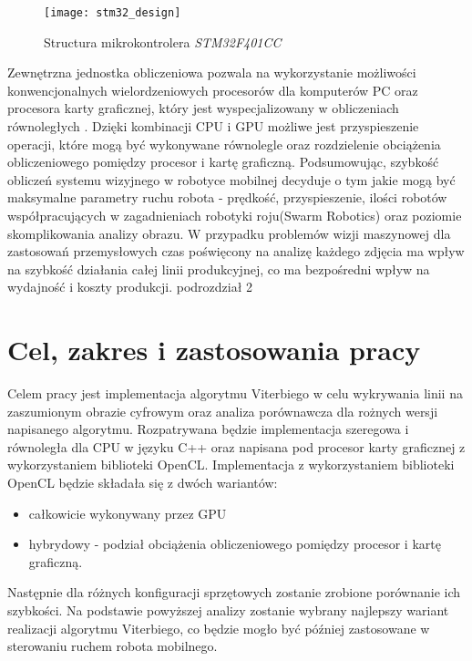 \documentclass[document.tex]{subfiles}
\begin{document}
	\begin{figure}[h]
	\texttt{[image: stm32\_design]}
	\caption{Structura mikrokontrolera \textit{STM32F401CC}\protect\cite{STM32_microcontrollers}}
	\label{fig:stm32}
	\end{figure}

Zewnętrzna jednostka obliczeniowa pozwala na wykorzystanie możliwości konwencjonalnych wielordzeniowych procesorów dla komputerów PC oraz procesora karty graficznej, który jest wyspecjalizowany w obliczeniach równoległych\cite{GPU_vs_CPU_nvidia} \cite{Computer_Architecture_Patterson_Hennesy}\cite{GPUs_Closer_Look}. 
Dzięki kombinacji CPU i GPU możliwe jest przyspieszenie operacji,
które mogą być wykonywane równolegle oraz rozdzielenie obciążenia obliczeniowego pomiędzy
procesor i kartę graficzną. 
\indent Podsumowując, szybkość obliczeń systemu wizyjnego w robotyce mobilnej decyduje o tym jakie
mogą być maksymalne parametry ruchu robota - prędkość, przyspieszenie, ilości robotów współpracujących w zagadnieniach robotyki roju(Swarm Robotics) oraz poziomie skomplikowania
analizy obrazu. W przypadku problemów wizji maszynowej dla zastosowań przemysłowych czas poświęcony na analizę każdego zdjęcia ma wpływ na szybkość działania całej linii produkcyjnej, co ma bezpośredni wpływ na wydajność i koszty produkcji.  
podrozdział 2 
\section{Cel, zakres i zastosowania pracy}
\indent Celem pracy jest implementacja algorytmu Viterbiego w celu wykrywania linii na zaszumionym obrazie cyfrowym oraz analiza porównawcza dla rożnych wersji napisanego algorytmu.
\indent Rozpatrywana będzie implementacja szeregowa i równoległa dla CPU w języku C++ oraz 
napisana pod procesor karty graficznej z wykorzystaniem biblioteki OpenCL. Implementacja
z wykorzystaniem biblioteki OpenCL będzie składała się z dwóch wariantów:
\begin{itemize}
	\item całkowicie wykonywany przez GPU
	\item hybrydowy - podział obciążenia obliczeniowego pomiędzy procesor i kartę graficzną.
\end{itemize} 
Następnie dla różnych konfiguracji sprzętowych zostanie zrobione porównanie ich szybkości.
\indent Na podstawie powyższej analizy zostanie wybrany najlepszy wariant realizacji 
algorytmu Viterbiego, co będzie mogło być później zastosowane w sterowaniu ruchem robota
mobilnego.  
\end{document}
